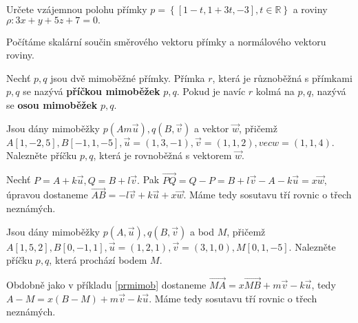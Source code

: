 \begin{priklad}
Určete vzájemnou polohu přímky $p=\left \{ [1-t,1+3t,-3],t \in \mathbb R \right \} $ a
roviny $\rho:3x+y+5z+7=0.$
\end{priklad}

\begin{reseni}
Počítáme skalární součin směrového vektoru přímky a normálového vektoru roviny.
\end{reseni}

\begin{definition}
Nechť $p,q$ jsou dvě mimoběžné přímky. Přímka $r$, která je různoběžná s přímkami
$p,q$ se nazývá \textbf{příčkou mimoběžek} $p,q$. Pokud je navíc $r$ kolmá na $p,q$,
nazývá se \textbf{osou mimoběžek} $p,q$.
\end{definition}

\begin{priklad}\label{prmimob}
Jsou dány mimoběžky  $p(Am\vec u), q(B,\vec v)$ a vektor $\vec w$, přičemž
$A[1,-2,5],B[-1,1,-5], \vec u = (1,3,-1), \vec v=(1,1,2), vec w = (1,1,4).$
Nalezněte příčku $p,q$, která je rovnoběžná s vektorem $\vec w.$
\end{priklad}

\begin{reseni}
Nechť $P=A+k\vec u, Q=B+l\vec v.$ Pak $\overrightarrow{PQ}=Q-P=B+l\vec v - A - k\vec u=x\vec w,$
úpravou dostaneme $\overrightarrow{AB}=-l\vec v+k\vec u+x\vec w.$ Máme tedy
sosutavu tří rovnic o třech neznámých.
\end{reseni}

\begin{priklad}
Jsou dány mimoběžky $p(A,\vec u), q(B,\vec v)$ a bod $M$, přičemž
$A[1,5,2],B[0,-1,1], \vec u=(1,2,1), \vec v = (3,1,0), M[0,1,-5].$  Nalezněte
příčku $p,q$, která prochází bodem $M$.
\end{priklad}

\begin{reseni}
Obdobně jako v příkladu \ref{prmimob} dostaneme $\overrightarrow{MA}=x\overrightarrow{MB}+m\vec v-k\vec u$,
tedy $A-M=x(B-M)+m\vec v - k\vec u$. Máme tedy
sosutavu tří rovnic o třech neznámých.
\end{reseni}

